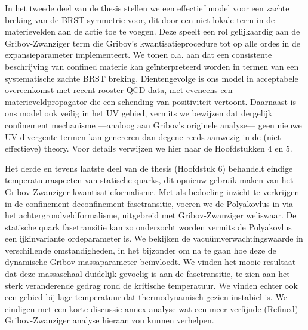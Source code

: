 In het tweede deel van de thesis stellen we een effectief model voor een zachte breking van de
BRST symmetrie voor, dit door een niet-lokale term in de materievelden aan de actie toe te
voegen. Deze speelt een rol gelijkaardig aan de Gribov-Zwanziger term die Gribov's
kwantisatieprocedure tot op alle ordes in de expansieparameter implementeert. We tonen o.a. aan
dat een consistente beschrijving van confined materie kan ge\"interpreteerd worden in termen van
een systematische zachte BRST breking. Dientengevolge is ons model in acceptabele overeenkomst
met recent rooster QCD data, met eveneens een materieveldpropagator die een schending van
positiviteit vertoont. Daarnaast is ons model ook veilig in het UV gebied, vermits we bewijzen
dat dergelijk confinement mechanisme ---analoog aan Gribov's originele analyse--- geen nieuwe
UV divergente termen kan genereren dan degene reeds aanwezig in de (niet-effectieve) theory.
Voor details verwijzen we hier naar de Hoofdstukken 4 en 5.

 

Het derde en tevens laatste deel van de thesis (Hoofdstuk 6) behandelt eindige
temperatuuraspecten van statische quarks, dit opnieuw gebruik maken van het Gribov-Zwanziger
kwantisatieformalisme. Met als bedoeling inzicht te verkrijgen in de confinement-deconfinement
fasetransitie, voeren we de Polyakovlus in via het achtergrondveldformalisme, uitgebreid met
Gribov-Zwanziger weliswaar. De statische quark fasetransitie kan zo onderzocht worden vermits
de Polyakovlus een ijkinvariante ordeparameter is. We bekijken de vacu\"umverwachtingswaarde in
verschillende omstandigheden, in het bijzonder om na te gaan hoe deze de dynamische Gribov
massaparameter be\"invloedt. We vinden het mooie resultaat dat deze massaschaal duidelijk
gevoelig is aan de fasetransitie, te zien aan het sterk veranderende gedrag rond de kritische
temperatuur. We vinden echter ook een gebied bij lage temperatuur dat thermodynamisch gezien
instabiel is. We eindigen met een korte discussie annex analyse wat een meer verfijnde
(Refined) Gribov-Zwanziger analyse hieraan zou kunnen verhelpen.
